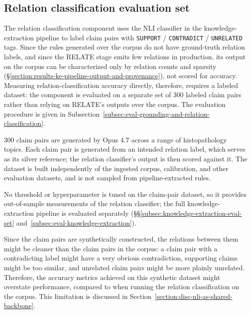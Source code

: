 \subsection{Relation classification evaluation set}\label{subsec:relation-classification-eval-set}

The relation classification component uses the NLI classifier in the knowledge-extraction pipeline to label claim pairs with \texttt{SUPPORT} / \texttt{CONTRADICT} / \texttt{UNRELATED} tags. Since the rules generated over the corpus do not have ground-truth relation labels, and since the RELATE stage emits few relations in production, its output on the corpus can be characterized only by relation counts and sparsity (§\ref{section:results-ke-pipeline-output-and-provenance}), not scored for accuracy. Measuring relation-classification accuracy directly, therefore, requires a labeled dataset: the component is evaluated on a separate set of 300 labeled claim pairs rather than relying on RELATE's outputs over the corpus. The evaluation procedure is given in Subsection~\ref{subsec:eval-grounding-and-relation-classification}.

300 claim pairs are generated by Opus 4.7 across a range of histopathology topics. Each claim pair is generated from an intended relation label, which serves as its silver reference; the relation classifier's output is then scored against it. The dataset is built independently of the ingested corpus, calibration, and other evaluation datasets, and is not sampled from pipeline-extracted rules.

No threshold or hyperparameter is tuned on the claim-pair dataset, so it provides out-of-sample measurements of the relation classifier; the full knowledge-extraction pipeline is evaluated separately (§§\ref{subsec:knowledge-extraction-eval-set} and~\ref{subsec:eval-knowledge-extraction}).

Since the claim pairs are synthetically constructed, the relations between them might be cleaner than the claim pairs in the corpus: a claim pair with a contradicting label might have a very obvious contradiction, supporting claims might be too similar, and unrelated claim pairs might be more plainly unrelated. Therefore, the accuracy metrics achieved on this synthetic dataset might overstate performance, compared to when running the relation classification on the corpus. This limitation is discussed in Section~\ref{section:disc-nli-as-shared-backbone}.